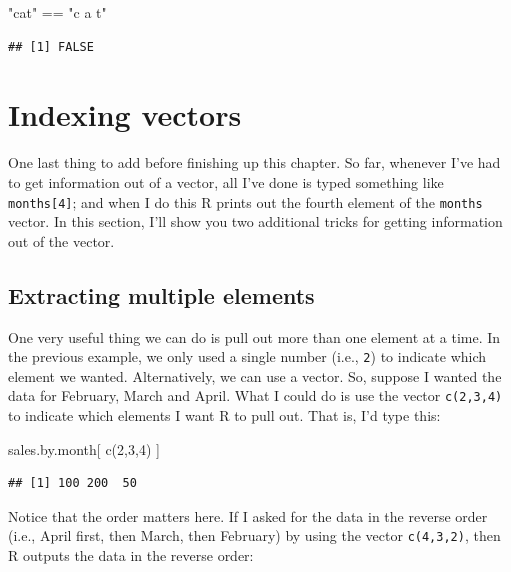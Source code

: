 \documentclass[
]{book}
\newenvironment{Shaded}{\begin{snugshade}}{\end{snugshade}}
\newcommand{\DecValTok}[1]{\textcolor[rgb]{0.00,0.00,0.81}{#1}}
\newcommand{\FunctionTok}[1]{\textcolor[rgb]{0.00,0.00,0.00}{#1}}
\newcommand{\NormalTok}[1]{#1}
\newcommand{\SpecialCharTok}[1]{\textcolor[rgb]{0.00,0.00,0.00}{#1}}
\newcommand{\StringTok}[1]{\textcolor[rgb]{0.31,0.60,0.02}{#1}}
\begin{document}
\begin{Shaded}
\begin{Highlighting}[]
\StringTok{"cat"} \SpecialCharTok{==} \StringTok{"c a t"}
\end{Highlighting}
\end{Shaded}

\begin{verbatim}
## [1] FALSE
\end{verbatim}

\hypertarget{indexing}{%
\section{Indexing vectors}\label{indexing}}

One last thing to add before finishing up this chapter. So far, whenever I've had to get information out of a vector, all I've done is typed something like \texttt{months{[}4{]}}; and when I do this R prints out the fourth element of the \texttt{months} vector. In this section, I'll show you two additional tricks for getting information out of the vector.

\hypertarget{extracting-multiple-elements}{%
\subsection{Extracting multiple elements}\label{extracting-multiple-elements}}

One very useful thing we can do is pull out more than one element at a time. In the previous example, we only used a single number (i.e., \texttt{2}) to indicate which element we wanted. Alternatively, we can use a vector. So, suppose I wanted the data for February, March and April. What I could do is use the vector \texttt{c(2,3,4)} to indicate which elements I want R to pull out. That is, I'd type this:

\begin{Shaded}
\begin{Highlighting}[]
\NormalTok{sales.by.month[ }\FunctionTok{c}\NormalTok{(}\DecValTok{2}\NormalTok{,}\DecValTok{3}\NormalTok{,}\DecValTok{4}\NormalTok{) ]}
\end{Highlighting}
\end{Shaded}

\begin{verbatim}
## [1] 100 200  50
\end{verbatim}

Notice that the order matters here. If I asked for the data in the reverse order (i.e., April first, then March, then February) by using the vector \texttt{c(4,3,2)}, then R outputs the data in the reverse order:
\end{document}
